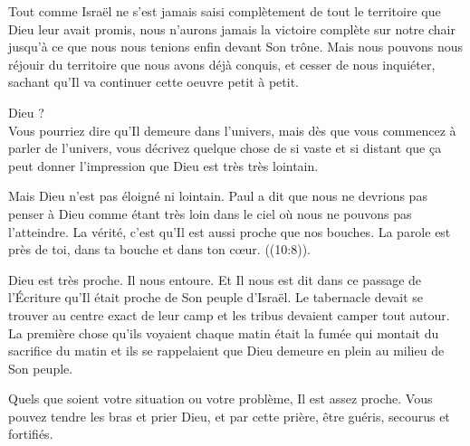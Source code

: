 Tout comme Israël ne s'est jamais saisi complètement
 de tout le territoire que Dieu leur avait promis,
 nous n'aurons jamais la victoire complète sur notre chair
 jusqu'à ce que nous nous tenions enfin devant Son trône.
 Mais nous pouvons nous réjouir du territoire que nous avons déjà conquis,
 et cesser de nous inquiéter, sachant qu'Il va continuer cette oeuvre
 \ocadr{}petit à petit. 

\dvrule






 Dieu ? \\[1ex]
Vous pourriez dire qu'Il demeure dans l'univers,
 mais dès que vous commencez à parler de l'univers,
 vous décrivez quelque chose de si vaste et si distant
 que ça peut donner l'impression que Dieu est très très lointain.

Mais Dieu n'est pas éloigné ni lointain.
 Paul a dit que nous ne devrions pas penser à Dieu comme étant très loin
 dans le ciel où nous ne pouvons pas l'atteindre.
 La vérité, c'est qu'Il est aussi proche que nos bouches.
 \og La parole est près de toi, dans ta bouche et dans ton cœur. \fg{}
 ((10:8)).

Dieu est très proche. Il nous entoure.
 Et Il nous est dit dans ce passage de l'Écriture
 qu'Il était proche de Son peuple d'Israël.
 Le tabernacle devait se trouver au centre exact de leur camp
 et les tribus devaient camper tout autour.
 La première chose qu'ils voyaient chaque matin était la fumée
 qui montait du sacrifice du matin
 \ocadr{}et ils se rappelaient que Dieu demeure en plein au milieu de Son peuple.


Quels que soient votre situation ou votre problème, Il est assez proche.
 Vous pouvez tendre les bras et prier Dieu, et par cette prière,
 être guéris, secourus et fortifiés. 

